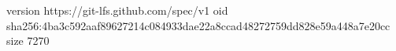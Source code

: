 version https://git-lfs.github.com/spec/v1
oid sha256:4ba3c592aaf89627214c084933dae22a8ccad48272759dd828e59a448a7e20cc
size 7270
